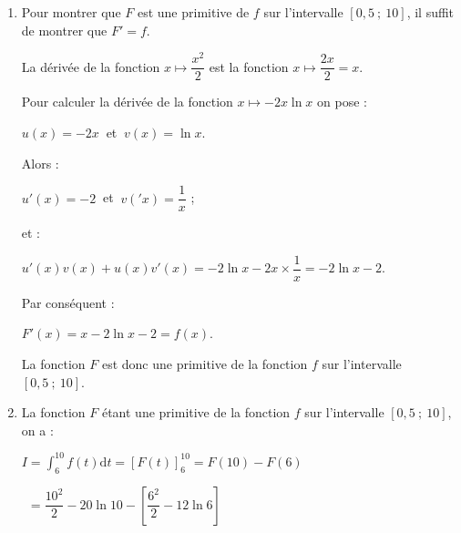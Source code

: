 \begin{corrige}
\begin{enumerate}
\begin{itemize}
               \par
               \`A la calculatrice, on trouve :
               \par
               $f(5,35) \approx -0,004 < 0$ ;
               \par
               $f(5,36) \approx 20,002 > 0$.
               \par
               Par conséquent :
               \[ 5,35 < \alpha < 5,36. \]
          \end{itemize}
          \item %
          Pour montrer que $F$ est une primitive de $f$  sur l'intervalle $[0,5~;~10]$, il suffit de montrer que $F'=f$.
          \par
          La dérivée de la fonction $x \longmapsto \dfrac{x^2}{2}$ est la fonction ${x \longmapsto \dfrac{2x}{2}=x}$.
          \par
          Pour calculer la dérivée de la fonction $x \longmapsto -2x\ln x$ on pose :
          \par
          $u(x)=-2x\ $ et $\ v(x)=\ln x$.
          \par
          Alors :
          \par
          $u'(x)=-2\ $ et $\ v('x)=\dfrac{1}{x}$ ;
          \par
          et :
          \par
          $u'(x)v(x)+u(x)v'(x)=-2\ln x - 2x \times \dfrac{1}{x}=-2\ln x - 2$.
          \par
          Par conséquent :
          \par
          $F'(x) = x -2\ln x - 2 = f(x)$.
          \par
          La fonction $F$ est donc une primitive de la fonction $f$ sur l'intervalle $[0,5~;~10]$.
          \par
          \item %
          La fonction $F$ étant une primitive de la fonction $f$ sur l'intervalle $[0,5~;~10]$, on a :
          \par
          $I=\displaystyle\int_{6}^{10}f(t)\text{d}t=\left[F(t)\right]_6^{10}=F(10)-F(6)$
          \par
          $\phantom{I}=\dfrac{10^2}{2} - 20\ln 10 - \left[\dfrac{6^2}{2} - 12\ln 6\right]$
          \par

\end{enumerate}
\end{corrige}
